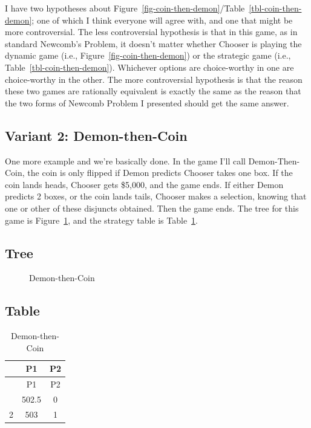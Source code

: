 \documentclass[
  10pt,
  letterpaper,
  DIV=11,
  numbers=noendperiod,
  twoside]{scrartcl}
\begin{document}
I have two hypotheses about
Figure~\ref{fig-coin-then-demon}/Table~\ref{tbl-coin-then-demon}; one of
which I think everyone will agree with, and one that might be more
controversial. The less controversial hypothesis is that in this game,
as in standard Newcomb's Problem, it doesn't matter whether Chooser is
playing the dynamic game (i.e., Figure~\ref{fig-coin-then-demon}) or the
strategic game (i.e., Table~\ref{tbl-coin-then-demon}). Whichever
options are choice-worthy in one are choice-worthy in the other. The
more controversial hypothesis is that the reason these two games are
rationally equivalent is exactly the same as the reason that the two
forms of Newcomb Problem I presented should get the same answer.

\subsection{Variant 2: Demon-then-Coin}\label{variant-2-demon-then-coin}

One more example and we're basically done. In the game I'll call
Demon-Then-Coin, the coin is only flipped if Demon predicts Chooser
takes one box. If the coin lands heads, Chooser gets \$5,000, and the
game ends. If either Demon predicts 2 boxes, or the coin lands tails,
Chooser makes a selection, knowing that one or other of these disjuncts
obtained. Then the game ends. The tree for this game is
Figure~\ref{fig-demon-then-coin}, and the strategy table is
Table~\ref{tbl-demon-then-coin}.

\subsection{Tree}

\begin{figure}


\caption{\label{fig-demon-then-coin}Demon-then-Coin}

\end{figure}%

\subsection{Table}

\begin{longtable}[]{@{}ccc@{}}
\caption{Demon-then-Coin}\label{tbl-demon-then-coin}\tabularnewline
\toprule\noalign{}
& P1 & P2 \\
\midrule\noalign{}
\endfirsthead
\toprule\noalign{}
& P1 & P2 \\
\midrule\noalign{}
\endhead
\bottomrule\noalign{}
\endlastfoot
1 & 502.5 & 0 \\
2 & 503 & 1 \\
\end{longtable}
\end{document}
